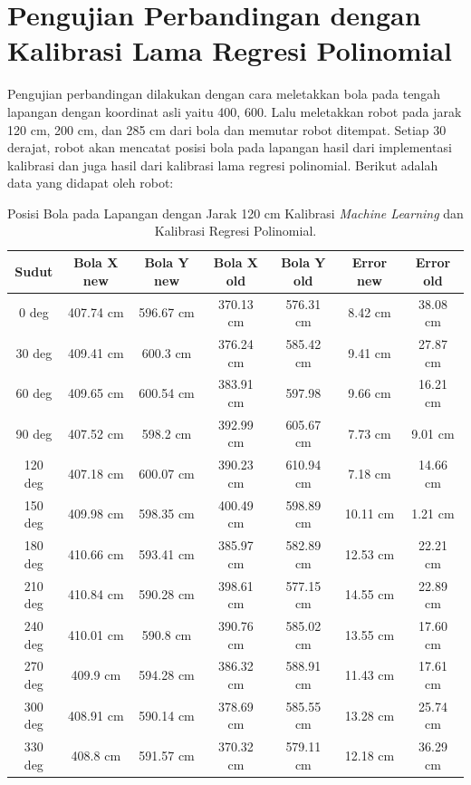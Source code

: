 \section{Pengujian Perbandingan dengan Kalibrasi Lama Regresi Polinomial}
\label{sec:pengujianperbandingan} 

Pengujian perbandingan dilakukan dengan cara meletakkan bola pada tengah lapangan dengan koordinat asli yaitu {400, 600}. Lalu meletakkan robot pada jarak 120 cm, 200 cm, dan 285 cm dari bola dan memutar robot ditempat. Setiap 30 derajat, robot akan mencatat posisi bola pada lapangan hasil dari implementasi kalibrasi dan juga hasil dari kalibrasi lama regresi polinomial. Berikut adalah data yang didapat oleh robot: 

\begin{longtable}{|c|c|c|c|c|c|c|}
  \caption{Posisi Bola pada Lapangan dengan Jarak 120 cm Kalibrasi \emph{Machine Learning} dan Kalibrasi Regresi Polinomial.}
  \label{tb:posisibolalapangan120}                                   \\
  \hline
  \rowcolor[HTML]{C0C0C0}
  \textbf{Sudut} & \textbf{Bola X new} & \textbf{Bola Y new} & \textbf{Bola X old} & \textbf{Bola Y old} & \textbf{Error new} & \textbf{Error old} \\
  \hline
  0 deg   & 407.74 cm   & 596.67 cm  &370.13 cm &576.31 cm &8.42 cm &38.08 cm  \\
  30 deg  & 409.41 cm   & 600.3 cm   &376.24 cm &585.42 cm &9.41 cm &27.87 cm  \\
  60 deg  & 409.65 cm   & 600.54 cm  &383.91 cm &597.98 &9.66 cm &16.21 cm   \\
  90 deg  & 407.52 cm   & 598.2 cm    &392.99 cm &605.67 cm &7.73 cm &9.01 cm\\
  120 deg  & 407.18 cm   & 600.07 cm   &390.23 cm &610.94 cm &7.18 cm &14.66 cm \\
  150 deg  & 409.98 cm   & 598.35 cm   &400.49 cm &598.89 cm &10.11 cm &1.21 cm \\
  180 deg  & 410.66 cm   & 593.41 cm   &385.97 cm &582.89 cm &12.53 cm &22.21 cm \\
  210 deg  & 410.84 cm   & 590.28 cm   &398.61 cm &577.15 cm &14.55 cm &22.89 cm \\
  240 deg  & 410.01 cm   & 590.8 cm    &390.76 cm &585.02 cm &13.55 cm &17.60 cm\\
  270 deg  & 409.9 cm   & 594.28 cm   &386.32 cm &588.91 cm &11.43 cm &17.61 cm \\
  300 deg  & 408.91 cm   & 590.14 cm  &378.69 cm &585.55 cm &13.28 cm &25.74 cm  \\
  330 deg  & 408.8 cm   & 591.57 cm   &370.32 cm &579.11 cm &12.18 cm &36.29 cm \\
  \hline
\end{longtable}

